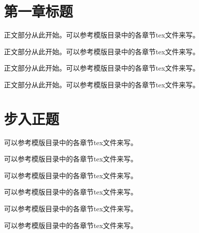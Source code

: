 \documentclass{swfcthesis}
\begin{document}

\makepreliminarypages
\frontmatter
\tableofcontents
\listoffigures
\listoftables
\mainmatter

\chapter{第一章标题}    %
\label{cha:one}


正文部分从此开始。可以参考模版目录中的各章节tex文件来写。

正文部分从此开始。可以参考模版目录中的各章节tex文件来写。

正文部分从此开始。可以参考模版目录中的各章节tex文件来写。

正文部分从此开始。可以参考模版目录中的各章节tex文件来写。

\chapter{步入正题}
\label{cha:two}

可以参考模版目录中的各章节tex文件来写。

可以参考模版目录中的各章节tex文件来写。

可以参考模版目录中的各章节tex文件来写。

可以参考模版目录中的各章节tex文件来写。

可以参考模版目录中的各章节tex文件来写。

可以参考模版目录中的各章节tex文件来写。
\end{document}

